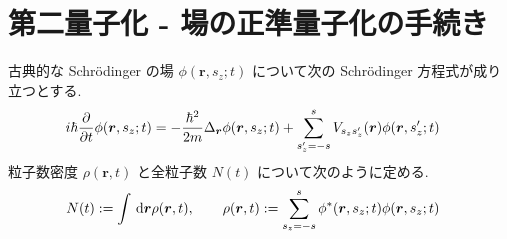 \documentclass[uplatex,dvipdfmx,a4paper,11pt]{jlreq}
\newcommand{\rr}{\bm{r}}
\numberwithin{equation}{section}
\theoremstyle{definition}
\begin{document}
\section{第二量子化 - 場の正準量子化の手続き}
\begin{definition}
  古典的な Schrödinger の場 $\phi(\rr, s_z; t)$ について次の Schrödinger 方程式が成り立つとする.
  \begin{align}
    i\hbar\diffp{}{t}\phi(\rr, s_z; t) & = -\frac{\hbar^2}{2m}\Delta_{\rr}\phi(\rr, s_z; t) + \sum_{s_z' = -s}^{s}V_{s_zs_z'}(\rr)\phi(\rr, s_z'; t)
  \end{align}
  粒子数密度 $\rho(\rr, t)$ と全粒子数 $N(t)$ について次のように定める.
  \begin{align}
    N(t) & := \int\dl{\rr}\rho(\rr, t), \qquad \rho(\rr, t) := \sum_{s_z = -s}^{s}\phi^*(\rr, s_z; t)\phi(\rr, s_z; t)
  \end{align}
\end{definition}
\end{document}
